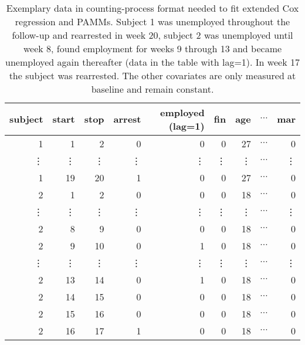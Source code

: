 \documentclass[submit]{smj}
\begin{document}
\begin{table}[!h]
\caption{Exemplary data in counting-process format needed to fit extended Cox
regression and PAMMs. Subject 1 was unemployed throughout the follow-up and
rearrested in week 20, subject 2 was unemployed until week 8, found employment
for weeks 9 through 13 and became unemployed again thereafter (data in the
table with lag=1). In week 17 the subject was rearrested.
The other covariates are only measured at baseline and remain constant.}
\label{tab:prisonlong}\

\centering
\begin{tabular}{rrrrrrrrr}
  \hline
subject & start  & stop   & arrest & employed (lag=1) & fin    & age    & $\cdots$ & mar \\
\hline
1       & 1      & 2      & 0      & 0        & 0      & 27     & $\cdots$ & 0 \\
\vdots  & \vdots & \vdots & \vdots & \vdots   & \vdots & \vdots & $\cdots$ & \vdots\\
1       & 19     & 20     & 1      & 0        & 0      & 27     & $\cdots$ & 0 \\
\hline
2       & 1      & 2      & 0      & 0        & 0      & 18     & $\cdots$ & 0 \\
\vdots  & \vdots & \vdots & \vdots & \vdots   & \vdots & \vdots & $\cdots$ & \vdots\\
2       & 8      & 9     & 0      & 0        & 0      & 18     & $\cdots$ & 0 \\
2       & 9      & 10     & 0      & 1        & 0      & 18     & $\cdots$ & 0 \\
\vdots  & \vdots & \vdots & \vdots & \vdots   & \vdots & \vdots & $\cdots$ & \vdots\\
2       & 13     & 14     & 0      & 1        & 0      & 18     & $\cdots$ & 0 \\
2       & 14     & 15     & 0      & 0        & 0      & 18     & $\cdots$ & 0 \\
2       & 15     & 16     & 0      & 0        & 0      & 18     & $\cdots$ & 0 \\
2       & 16     & 17     & 1      & 0        & 0      & 18     & $\cdots$ & 0 \\
   \hline
\end{tabular}
\end{table}
\end{document}
